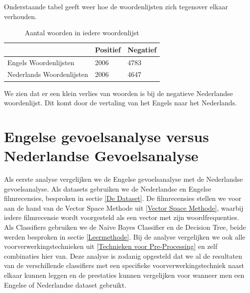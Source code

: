 Onderstaande tabel geeft weer hoe de woordenlijsten zich tegenover elkaar verhouden.

\begin{table}[h]
\centering
\caption{Aantal woorden in iedere woordenlijst}
\label{table: Verlies in woordenschat}
\begin{tabular}{l|l|l|}
\cline{2-3}
 & Positief & Negatief \\ \hline
\multicolumn{1}{|l|}{Engels Woordenlijsten}     & 2006     & 4783     \\ \hline
\multicolumn{1}{|l|}{Nederlands Woordenlijsten} & 2006     & 4647     \\ \hline
\end{tabular}
\end{table}

We zien dat er een klein verlies van woorden is bij de negatieve Nederlandse woordenlijst. Dit komt door de vertaling van het Engels naar het Nederlands.

\section{Engelse gevoelsanalyse versus Nederlandse Gevoelsanalyse}\label{Engelse gevoelsanalyse versus Nederlandse Gevoelsanalyse}

Als eerste analyse vergelijken we de Engelse gevoelsanalyse met de Nederlandse gevoelsanalyse. Als datasets gebruiken we de Nederlandse en Engelse filmrecensies, besproken in sectie \ref{De Dataset}. De filmrecensies stellen we voor aan de hand van de Vector Space Methode uit \ref{Vector Space Methode}, waarbij iedere filmrecensie wordt voorgesteld als een vector met zijn woordfrequenties. Als Classifiers gebruiken we de Naive Bayes Classifier en de Decision Tree, beide werden besproken in sectie \ref{Leermethode}. Bij de analyse vergelijken we ook alle voorverwerkingstechnieken uit \ref{Technieken voor Pre-Processing} en zelf combinaties hier van. Deze analyse is zodanig opgesteld dat we al de resultaten van de verschillende classifiers met een specifieke voorverwerkingstechniek naast elkaar kunnen leggen en de prestaties kunnen vergelijken voor wanneer men een Engelse of Nederlandse dataset gebruikt.\\

